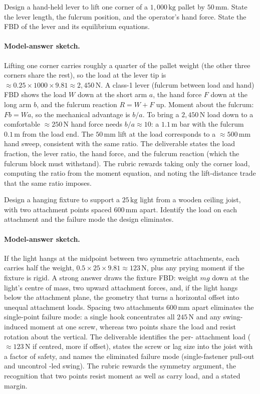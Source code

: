 \begin{exercise}
Design a hand-held lever to lift one corner of a $1{,}000\,
\si{\kilogram}$ pallet by $50\,\si{\milli\meter}$. State the lever
length, the fulcrum position, and the operator's hand force. State
the FBD of the lever and its equilibrium equations.
\paragraph{Model-answer sketch.} Lifting one corner carries roughly a
quarter of the pallet weight (the other three corners share the rest),
so the load at the lever tip is $\approx 0.25 \times 1000 \times 9.81
\approx 2{,}450\,\text{N}$. A class-1 lever (fulcrum between load and
hand) FBD shows the load $W$ down at the short arm $a$, the hand force
$F$ down at the long arm $b$, and the fulcrum reaction $R = W + F$ up.
Moment about the fulcrum: $F b = W a$, so the mechanical advantage is
$b/a$. To bring a $2{,}450\,\text{N}$ load down to a comfortable
$\approx 250\,\text{N}$ hand force needs $b/a \approx 10$: a
$1.1\,\si{\meter}$ bar with the fulcrum $0.1\,\si{\meter}$ from the load
end. The $50\,\si{\milli\meter}$ lift at the load corresponds to a
$\approx 500\,\si{\milli\meter}$ hand sweep, consistent with the same
ratio. The deliverable states the load fraction, the lever ratio, the
hand force, and the fulcrum reaction (which the fulcrum block must
withstand). The rubric rewards taking only the corner load, computing
the ratio from the moment equation, and noting the lift-distance trade
that the same ratio imposes.
\end{exercise}

\begin{exercise}
Design a hanging fixture to support a $25\,\si{\kilogram}$ light from
a wooden ceiling joist, with two attachment points spaced
$600\,\si{\milli\meter}$ apart. Identify the load on each attachment
and the failure mode the design eliminates.
\paragraph{Model-answer sketch.} If the light hangs at the midpoint
between two symmetric attachments, each carries half the weight, $0.5
\times 25 \times 9.81 \approx 123\,\text{N}$, plus any prying moment if
the fixture is rigid. A strong answer draws the fixture FBD: weight $mg$
down at the light's centre of mass, two upward attachment forces, and,
if the light hangs below the attachment plane, the geometry that turns a
horizontal offset into unequal attachment loads. Spacing two attachments
$600\,\si{\milli\meter}$ apart eliminates the single-point failure mode:
a single hook concentrates all $245\,\text{N}$ and any swing-induced
moment at one screw, whereas two points share the load and resist
rotation about the vertical. The deliverable identifies the per-
attachment load ($\approx 123\,\text{N}$ if centred, more if offset),
states the screw or lag size into the joist with a factor of safety, and
names the eliminated failure mode (single-fastener pull-out and uncontrol
-led swing). The rubric rewards the symmetry argument, the recognition
that two points resist moment as well as carry load, and a stated margin.
\end{exercise}

